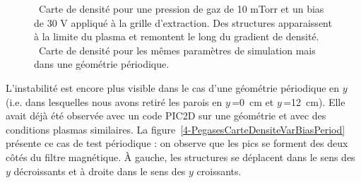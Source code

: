 \begin{refsection}
	\begin{figure}[!htbp]
  \centering
    \caption{~Carte de densité pour une
    pression de gaz de 10 mTorr et un bias de 30 V appliqué à la grille
    d'extraction. Des structures
    apparaissent à la limite du plasma et
    remontent le long du gradient de
    densité. ~Carte de densité pour les
    mêmes paramètres de simulation mais dans une géométrie périodique.}
    \label{4-PegasesCarteDensiteVarBias52}
\end{figure}

	L'instabilité est encore plus visible dans le cas d'une géométrie périodique
	en $y$ (i.e. dans lesquelles nous avons retiré les parois en $y\,$=0~cm et
	$y\,$=12~cm). Elle avait déjà été observée avec un code PIC2D sur
	une géométrie et avec des conditions plasmas similaires. La
	figure~\ref{4-PegasesCarteDensiteVarBiasPeriod} présente ce cas de test
	périodique :
	on observe que les pics se forment des deux côtés du filtre magnétique. À gauche, les
	structures se déplacent dans le sens des $y$ décroissants et à droite dans le
	sens des $y$ croissants.
	

\end{refsection}

